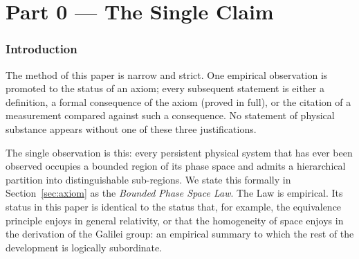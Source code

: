 \documentclass[11pt,twocolumn,a4paper]{article}
\theoremstyle{axiomstyle}
\theoremstyle{conseqstyle}
\theoremstyle{definition}
\theoremstyle{remark}
\begin{document}
\vspace{6pt}
\tableofcontents
\vspace{6pt}

\clearpage

\part*{Part 0 --- The Single Claim}

\section{Introduction}
\label{sec:intro}

The method of this paper is narrow and strict. One empirical observation is promoted to the status of an axiom; every subsequent statement is either a definition, a formal consequence of the axiom (proved in full), or the citation of a measurement compared against such a consequence. No statement of physical substance appears without one of these three justifications.

The single observation is this: every persistent physical system that has ever been observed occupies a bounded region of its phase space and admits a hierarchical partition into distinguishable sub-regions. We state this formally in Section~\ref{sec:axiom} as the \emph{Bounded Phase Space Law}. The Law is empirical. Its status in this paper is identical to the status that, for example, the equivalence principle enjoys in general relativity, or that the homogeneity of space enjoys in the derivation of the Galilei group: an empirical summary to which the rest of the development is logically subordinate.
\end{document}
